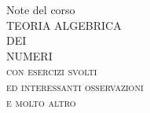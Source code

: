 {\thispagestyle{empty}\centering
\vspace{1\textheight}
{\large Note del corso}\\[\baselineskip]
{\Huge TEORIA ALGEBRICA}\\[\baselineskip]
{\Large DEI}\\[\baselineskip]
{\Huge NUMERI}\\[\baselineskip]
{\scshape con esercizi svolti}\\
{\scshape ed interessanti osservazioni}\\
{\large\scshape e molto altro}\\
\vfill\null}
